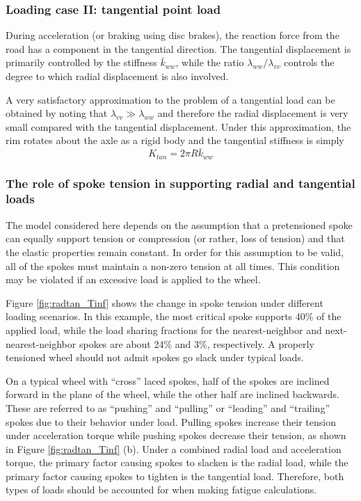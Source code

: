 \documentclass[../thesis.tex]{subfiles}
\begin{document}
\subsubsection{Loading case II: tangential point load}

During acceleration (or braking using disc brakes), the reaction force from the road has a component in the tangential direction. The tangential displacement is primarily controlled by the stiffness $\bar{k}_{ww}$, while the ratio $\lambda_{ww}/\lambda_{vv}$ controls the degree to which radial displacement is also involved.

A very satisfactory approximation to the problem of a tangential load can be obtained by noting that $\lambda_{vv}\gg\lambda_{ww}$ and therefore the radial displacement is very small compared with the tangential displacement. Under this approximation, the rim rotates about the axle as a rigid body and the tangential stiffness is simply
\begin{equation}
\label{eq:Ktan}
K_{tan} = 2\pi R \bar{k}_{ww}
\end{equation}

\subsubsection{The role of spoke tension in supporting radial and tangential loads}

The model considered here depends on the assumption that a pretensioned spoke can equally support tension or compression (or rather, loss of tension) and that the elastic properties remain constant. In order for this assumption to be valid, all of the spokes must maintain a non-zero tension at all times. This condition may be violated if an excessive load is applied to the wheel.

Figure \ref{fig:radtan_Tinf} shows the change in spoke tension under different loading scenarios. In this example, the most critical spoke supports 40\% of the applied load, while the load sharing fractions for the nearest-neighbor and next-nearest-neighbor spokes are about 24\% and 3\%, respectively. A properly tensioned wheel should not admit spokes go slack under typical loads.

On a typical wheel with ``cross'' laced spokes, half of the spokes are inclined forward in the plane of the wheel, while the other half are inclined backwards. These are referred to as ``pushing'' and ``pulling'' or ``leading'' and ``trailing'' spokes due to their behavior under load. Pulling spokes increase their tension under acceleration torque while pushing spokes decrease their tension, as shown in Figure \ref{fig:radtan_Tinf} (b). Under a combined radial load and acceleration torque, the primary factor causing spokes to slacken is the radial load, while the primary factor causing spokes to tighten is the tangential load. Therefore, both types of loads should be accounted for when making fatigue calculations.
\end{document}
